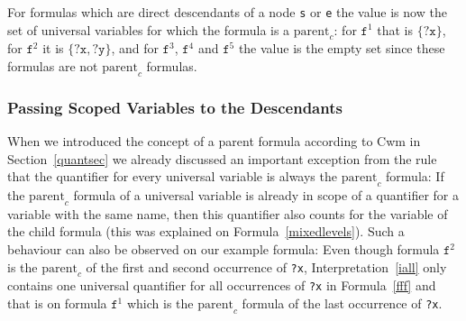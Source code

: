 For formulas which are direct descendants of a node \texttt{s} or \texttt{e} the value is now the set of universal variables for which the formula is a $\text{parent}_c$:
for $\texttt{f}^1$ that is $\{\texttt{?x}\}$, for $\texttt{f}^2$ it is $\{\texttt{?x}, \texttt{?y}\}$, and for $\texttt{f}^3$, $\texttt{f}^4$ and $\texttt{f}^5$ 
the value is the empty set since these formulas are not 
$\text{parent}_c$ formulas. 



\subsubsection*{Passing Scoped Variables to the Descendants}
When we introduced the concept of a parent formula according to Cwm in Section~\ref{quantsec} we already discussed an important exception from the rule that the quantifier 
for every universal variable is always the $\text{parent}_c$ formula: If the $\text{parent}_c$ formula of a universal variable is already in scope of a quantifier for a 
variable with the same name, then this quantifier also counts for the variable of the child formula (this was explained on Formula~\ref{mixedlevels}). 
Such a behaviour can also be observed on our example formula: Even though
formula $\texttt{f}^2$ is the $\text{parent}_c$ of the first and second occurrence of \texttt{?x}, %
Interpretation~\ref{iall} 
 only contains one universal quantifier for all occurrences of \texttt{?x} in Formula~\ref{fff} and that is on formula $\texttt{f}^1$ which is the $\text{parent}_c$ formula 
 of the last occurrence of \texttt{?x}.
%  
 
